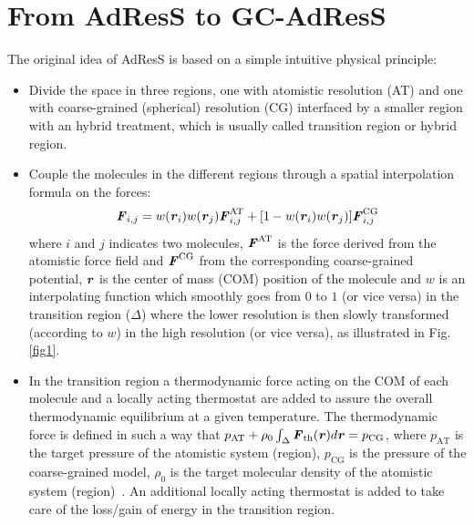 \documentclass[a4paper,preprint,unsortedaddress]{revtex4-1}
\newcommand{\vect}[1]{\textbf{\textit{#1}}}
\newcommand{\AT}{{\textrm{{AT}}}}
\newcommand{\CG}{{\textrm{CG}}}
\newcommand{\thf}{{\textrm{th}}}
\begin{document}
\section{From AdResS to GC-AdResS}
The original idea of AdResS is based on a simple intuitive physical principle:
\begin{itemize}
\item Divide the space in three regions, one with atomistic resolution (AT) and one with coarse-grained (spherical) resolution (CG) interfaced by a smaller region with an hybrid treatment, which is usually called transition region or hybrid region.
\item Couple the molecules in the different regions through a spatial interpolation formula on the forces:
\begin{equation}
{\vect F}_{i,j}=w(\vect r_i)w(\vect r_j){\vect
  F}_{i,j}^{\AT}+[1-w(\vect r_i)w(\vect r_j)]{\vect F}^{\CG}_{i,j} 
\label{eqforce}
\end{equation}
where $i$ and $j$ indicates two molecules, ${\vect F}^{\AT}$ is the
force derived from the atomistic force field and  ${\vect F}^{\CG}$
from the corresponding coarse-grained potential, {$\vect r$ is the center of mass (COM) position of}
the molecule and $w$ is an interpolating function which smoothly goes from $0$
to $1$ (or vice versa) in the transition region ($\Delta$) where the lower resolution is then
slowly transformed (according to $w$) in the high resolution (or vice versa),
as illustrated in Fig.\ref{fig1}.
\item In the transition region a thermodynamic force acting on the COM of each molecule and a locally acting thermostat are added to assure the overall thermodynamic equilibrium at a given temperature. The thermodynamic force is defined in such a way that
  $p_{\AT}+\rho_{0}\int_{\Delta}{\vect F}_{\thf}({\vect r})d{\vect r}=p_{\CG}$,
  where $p_{\AT}$  is the target pressure of the atomistic system (region), $p_{\CG}$ is the pressure of the coarse-grained model, $\rho_{0}$ is the target molecular density of the atomistic system (region)~\cite{prl12}. An additional locally acting thermostat is added to take care of the loss/gain of energy in the transition region.
\end{itemize}
\end{document}
